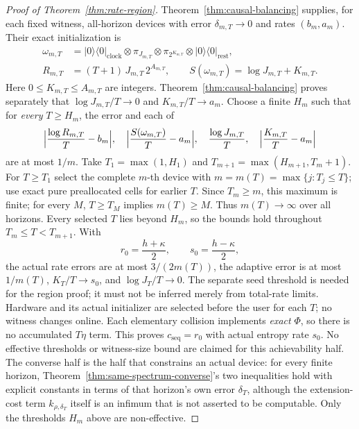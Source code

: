 \documentclass[11pt,a4paper]{article}
\numberwithin{equation}{section}
\theoremstyle{plain}
\theoremstyle{definition}
\newcommand{\cseq}{c_{\mathrm{seq}}}
\newcommand{\ketbra}[2]{\lvert #1 \rangle\langle #2 \rvert}
\begin{document}
\begin{proof}[Proof of Theorem~\ref{thm:rate-region}]
Theorem~\ref{thm:causal-balancing} supplies, for each fixed witness,
all-horizon devices with error $\delta_{m,T}\to 0$ and rates $(b_m,a_m)$.
Their exact initialization is
\begin{equation}
\label{eq:rate-diagonal}
\begin{aligned}
\omega_{m,T}&=\ketbra{0}{0}_{\mathrm{clock}}\otimes\pi_{J_{m,T}}
\otimes\pi_{2^{K_{m,T}}}\otimes\ketbra{0}{0}_{\mathrm{rest}},\\
R_{m,T}&=(T+1)\,J_{m,T}\,2^{A_{m,T}},\qquad
S(\omega_{m,T})=\log J_{m,T}+K_{m,T}.
\end{aligned}
\end{equation}
Here $0\le K_{m,T}\le A_{m,T}$ are integers. Theorem~\ref{thm:causal-balancing}
proves separately that $\log J_{m,T}/T\to 0$ and $K_{m,T}/T\to a_m$. Choose a
finite $H_m$ such that for \emph{every} $T\ge H_m$, the error and each of
\[
\Bigl\lvert\frac{\log R_{m,T}}{T}-b_m\Bigr\rvert,\quad
\Bigl\lvert\frac{S(\omega_{m,T})}{T}-a_m\Bigr\rvert,\quad
\frac{\log J_{m,T}}{T},\quad
\Bigl\lvert\frac{K_{m,T}}{T}-a_m\Bigr\rvert
\]
are at most $1/m$. Take $T_1=\max(1,H_1)$ and
$T_{m+1}=\max(H_{m+1},T_m+1)$. For $T\ge T_1$ select the complete $m$-th
device with $m=m(T)=\max\{j: T_j\le T\}$; use exact pure preallocated cells
for earlier $T$. Since $T_m\ge m$, this maximum is finite; for every $M$,
$T\ge T_M$ implies $m(T)\ge M$. Thus $m(T)\to\infty$ over all horizons. Every
selected $T$ lies beyond $H_m$, so the bounds hold throughout
$T_m\le T<T_{m+1}$. With
\begin{equation}
\label{eq:corner}
r_0=\frac{h+\kappa}{2},\qquad s_0=\frac{h-\kappa}{2},
\end{equation}
the actual rate errors are at most $3/(2m(T))$, the adaptive error is at most
$1/m(T)$, $K_T/T\to s_0$, and $\log J_T/T\to 0$. The separate seed threshold
is needed for the region proof; it must not be inferred merely from total-rate
limits. Hardware and its actual initializer are selected before the user for
each $T$; no witness changes online. Each elementary collision implements
\emph{exact} $\Phi$, so there is no accumulated $T\eta$ term. This proves
$\cseq=r_0$ with actual entropy rate $s_0$. No effective thresholds or
witness-size bound are claimed for this achievability half. The converse half
is the half that constrains an actual device: for every finite horizon,
Theorem~\ref{thm:same-spectrum-converse}'s two inequalities hold with explicit
constants in terms of that horizon's own error $\delta_T$, although the
extension-cost term $k_{\rho,\delta_T}$ itself is an infimum that is not
asserted to be computable. Only the thresholds $H_m$ above are non-effective.


\end{proof}
\end{document}
